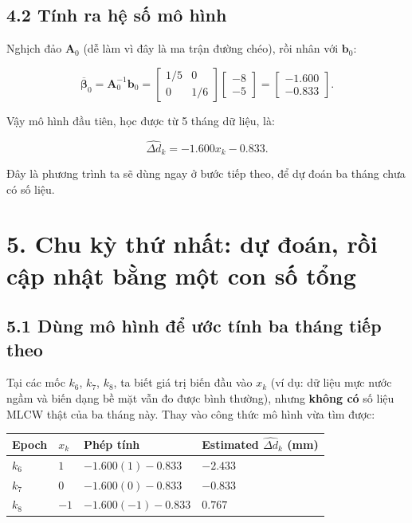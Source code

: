 \documentclass[12pt]{article}
\begin{document}
\subsection{4.2 Tính ra hệ số mô hình}

Nghịch đảo $\boldsymbol{A}_0$ (dễ làm vì đây là ma trận đường chéo), rồi nhân với $\boldsymbol{b}_0$:

\[
\overline{\boldsymbol{\beta}}_0
=
\boldsymbol{A}_0^{-1}\boldsymbol{b}_0
=
\begin{bmatrix}
1/5 & 0\\
0 & 1/6
\end{bmatrix}
\begin{bmatrix}
-8\\
-5
\end{bmatrix}
=
\begin{bmatrix}
-1.600\\
-0.833
\end{bmatrix}.
\]

Vậy mô hình đầu tiên, học được từ 5 tháng dữ liệu, là:

\[
\widehat{\Delta d}_k
=
-1.600x_k-0.833.
\]

Đây là phương trình ta sẽ dùng ngay ở bước tiếp theo, để dự đoán ba tháng chưa có số liệu.

\section{5. Chu kỳ thứ nhất: dự đoán, rồi cập nhật bằng một con số tổng}

\subsection{5.1 Dùng mô hình để ước tính ba tháng tiếp theo}

Tại các mốc $k_6$, $k_7$, $k_8$, ta biết giá trị biến đầu vào $x_k$ (ví dụ: dữ liệu mực nước ngầm và biến dạng bề mặt vẫn đo được bình thường), nhưng \textbf{không có} số liệu MLCW thật của ba tháng này. Thay vào công thức mô hình vừa tìm được:

\begin{longtable}{@{}llll@{}}
\toprule
Epoch & $x_k$ & Phép tính & Estimated $\widehat{\Delta d}_k$ (mm) \\
\midrule
$k_6$ & $1$ & $-1.600(1)-0.833$ & $-2.433$ \\
$k_7$ & $0$ & $-1.600(0)-0.833$ & $-0.833$ \\
$k_8$ & $-1$ & $-1.600(-1)-0.833$ & $0.767$ \\
\bottomrule
\end{longtable}
\end{document}

